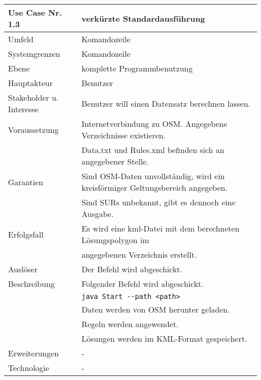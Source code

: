 \begin{tabular}{| l | l |}
 \hline
 \textbf{Use Case Nr. 1.3} & verkürzte Standardausführung\\
 \hline
 Umfeld & Komandozeile\\
 \hline
 Systemgrenzen & Komandozeile\\
 \hline
 Ebene & komplette Programmbenutzung\\
 \hline
 Hauptakteur & Benutzer\\
 \hline
 Stakeholder u. Interesse & Benutzer will einen Datensatz berechnen lassen.\\
 \hline
 Voraussetzung & Internetverbindung zu OSM. Angegebene Verzeichnisse existieren.\\
	      & Data.txt und Rules.xml befinden sich an angegebener Stelle. \\
 \hline
 Garantien & Sind OSM-Daten unvollständig, wird ein kreisförmiger Geltungsbereich angegeben.\\
	  & Sind SURs unbekannt, gibt es dennoch eine Ausgabe.\\
 \hline
 Erfolgsfall & Es wird eine kml-Datei mit dem berechneten Lösungspolygon im\\
	    & angegebenen Verzeichnis erstellt.\\
 \hline
 Auslöser & Der Befehl wird abgeschickt.\\
 \hline
 Beschreibung & Folgender Befehl wird abgeschickt.\\
	    & \verb|java Start --path <path>|\\
	    & Daten werden von OSM herunter geladen.\\
	    & Regeln werden angewendet.\\
	    & Lösungen werden im KML-Format gespeichert.\\
 \hline
 Erweiterungen & -\\
 \hline
 Technologie & -\\
 \hline
\end{tabular}





